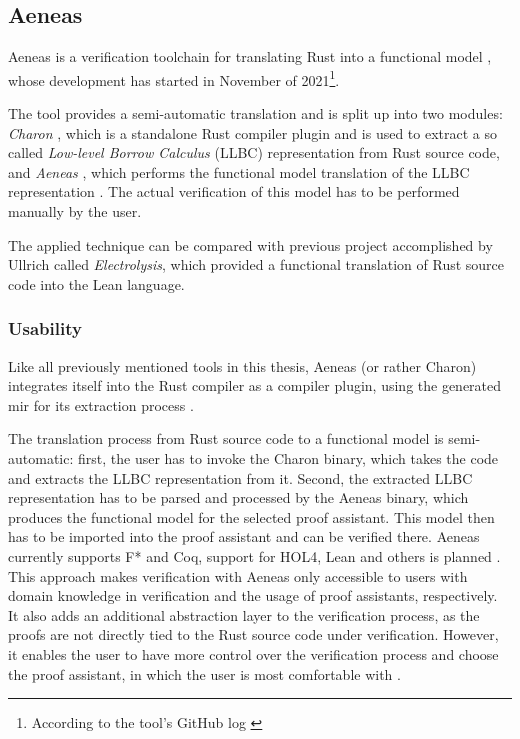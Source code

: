 \subsection{Aeneas}

Aeneas is a verification toolchain for translating Rust into a functional model \cite{ho_aeneas_2022}, whose development has started in November of 2021\footnote{According to the tool's GitHub log \cite{aeneasverif_initial_2021}}. 

The tool provides a semi-automatic translation and is split up into two modules: \textit{Charon} \cite{aeneasverif_aeneasverifcharon_2023}, which is a standalone Rust compiler plugin and is used to extract a so called \textit{Low-level Borrow Calculus} (LLBC) representation from  Rust source code, and \textit{Aeneas} \cite{aeneasverif_aeneasverifaeneas_2023}, which performs the functional model translation of the LLBC representation \cite{ho_aeneas_2022}. The actual verification of this model has to be performed manually by the user.

The applied technique can be compared with previous project accomplished by Ullrich \cite{ullrich_simple_2016} called \textit{Electrolysis}, which provided a functional translation of Rust source code into the Lean language. 

\subsubsection{Usability}
Like all previously mentioned tools in this thesis, Aeneas (or rather Charon) integrates itself into the Rust compiler as a compiler plugin, using the generated \acs{mir} for its extraction process \cite{ho_aeneas_2022}.

The translation process from Rust source code to a functional model is semi-automatic: first, the user has to invoke the Charon binary, which takes the code and extracts the LLBC representation from it. Second, the extracted LLBC representation has to be parsed and processed by the Aeneas binary, which produces the functional model for the selected proof assistant. This model then has to be imported into the proof assistant and can be verified there. Aeneas currently supports F* and Coq, support for HOL4, Lean and others is planned \cite{aeneasverif_aeneasverifaeneas_2023,ho_aeneas_2022}. This approach makes verification with Aeneas only accessible to users with domain knowledge in verification and the usage of proof assistants, respectively. It also adds an additional abstraction layer to the verification process, as the proofs are not directly tied to the Rust source code under verification.
However, it enables the user to have more control over the verification process and choose the proof assistant, in which the user is most comfortable with \cite{ho_aeneas_2022}. 

